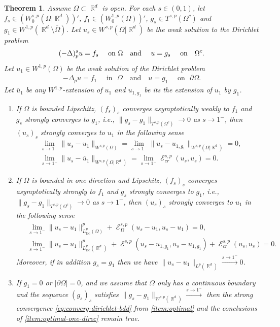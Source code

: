 \documentclass[12pt, reqno]{amsart}%
\theoremstyle{plain}  %
\newtheorem{theorem}{Theorem}[section]
\theoremstyle{definition}  %
\numberwithin{equation}{section}
\DeclareMathOperator{\loc}{loc}
\DeclareMathOperator{\cE}{\mathcal{E}}
\DeclareMathOperator{\R}{\mathbb{R}}
\begin{document}
\begin{theorem}\label{thm:converg-dirichlet-frac}
Assume $\Omega\subset \R^d$ is open.  For each $s\in(0,1)$, let  $f_s\in  (W^{s,p}_0(\Omega|\R^d))'$, $f_1\in (W^{1,p}_0(\Omega))'$,  $g_s\in  T^{s,p}(\Omega^c)$ and $g_1\in W^{1,p}(\R^d\setminus\overline{\Omega})$.
Let  $u_s \in  W^{s,p}(\Omega|\R^d)$ be the weak solution to the Dirichlet problem
\begin{align*}
(-\Delta)^s_pu= f_{s} \quad 	\text{ on $\Omega$ \,\, and }	\quad u=g_{s} \quad \text{ on \,\, $\Omega^c$.}
\end{align*}
Let $u_1\in W^{1,p}(\Omega)$ be the  weak solution of  the Dirichlet  problem
\begin{align*}
-\Delta_p u = f_1 \quad \text{ in }\,\,  \Omega
\quad \text{and} \quad
 u = g_1 \quad \text{ on }\,\, \partial \Omega .
\end{align*}
Let $\overline{u}_1$ be any $W^{1,p}$-extension of $u_1$ and $u_{1,g_1}$ be its the extension of $u_1$ by $g_1$.
\begin{enumerate}[$(I)$]
\item  \label{item:optimal} If $\Omega$ is bounded Lipschitz, $ (f_s)_s$  converges asymptotically weakly to  $f_1$
and $g_s$ strongly converges to $g_1$, i.e.,  $\|g_s-g_1\|_{T^{s,p}(\Omega^c)}\to0$ as $s\to1^-$,
then $(u_s)_s$ strongly converges to $u_1$ in the following sense
\begin{align}\label{eq:converg-dirichlet-bdd}
&\lim_{s\to1^-}\|u_s -u_1\|_{W^{s,p}(\Omega)} = \lim_{s\to1^-}
\|u_s- u_{1,g_1}\|_{W^{s,p}(\Omega|\R^d)}=0, \\
& \lim_{s\to1^-}
\|u_s- \overline{u}_1\|_{W^{s,p}(\Omega|\R^d)}=\lim_{s\to1^-} \cE^{s,p}_{cr}(u_s, u_s)=0.
\end{align}
\item \label{item:optimal-one-direc} If  $\Omega$ is bounded in one direction and Lipschitz, $ (f_s)_s$  converges asymptotically strongly to  $f_1$
and $g_s$ strongly converges to $g_1$, i.e.,
$\|g_s-g_1\|_{T^{s,p}(\Omega^c)}\to0$ as $s\to1^-$,
then $(u_s)_s$ strongly converges to $u_1$ in the following sense
\begin{align}\label{eq:converg-dirichlet-loc}
\begin{split}
&\lim_{s\to1^-}\|u_s -u_1\|^p_{L^p_{\loc}(\Omega)}+ \cE^{s,p}_{\Omega}(u_s-u_1,u_s-u_1)=0,\\
& \lim_{s\to1^-}\|u_s -u_1\|^p_{L^p_{\loc}(\R^d)}+ \cE^{s,p}(u_s-u_{1,g_1},u_s-u_{1,g_1})+ \cE^{s,p}_{cr}(u_s, u_s)=0.
\end{split}
\end{align}
Moreover, if in addition $g_s=g_1$ then we have $\|u_s-u_1\|_{L^p(\R^d)}\xrightarrow{s\to1^-}0$.
\item If $g_1=0$ or $|\partial\Omega|=0$,  and we assume that  $\Omega$ only has a continuous boundary and the sequence $(g_s)_s$ satisfies
$\|g_s-g_1\|_{W^{s,p}(\R^d)}\xrightarrow{s\to1^-}$
then  the strong convergence \eqref{eq:converg-dirichlet-bdd} from \ref{item:optimal} and the conclusions of \ref{item:optimal-one-direc} remain true.
\end{enumerate}
\end{theorem}
\end{document}

